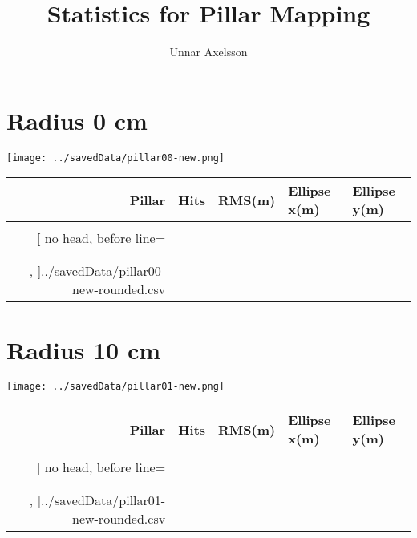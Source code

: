 \documentclass{article}
\begin{document}
\title{Statistics for Pillar Mapping}
\author{Unnar  Axelsson}

\maketitle

\section{Radius 0 cm}

\begin{center}
\texttt{[image: ../savedData/pillar00-new.png]}

\begin{tabular}{r|llll}
	\toprule%
	\bfseries Pillar & \bfseries Hits & \bfseries RMS(m) & \bfseries Ellipse x(m) & \bfseries Ellipse y(m)\\\midrule\\[-0.8cm]
	\csvreader[%
	  no head,
	  before line=\ifthenelse{\equal{\csvcoli}{Average}}{\\\midrule}{\\},
	  late after last line = \\\bottomrule,
	]{../savedData/pillar00-new-rounded.csv}{}{%
	  \csvcoli&\csvcolii&\csvcoliii&\csvcoliv&\csvcolv
	}
\end{tabular}
\end{center}



\newpage
\section{Radius 10 cm}
\begin{center}

\texttt{[image: ../savedData/pillar01-new.png]}

\begin{tabular}{r|llll}
	\toprule%
	\bfseries Pillar & \bfseries Hits & \bfseries RMS(m) & \bfseries Ellipse x(m) & \bfseries Ellipse y(m)\\\midrule\\[-0.8cm]
	\csvreader[%
	  no head,
	  before line=\ifthenelse{\equal{\csvcoli}{Average}}{\\\midrule}{\\},
	  late after last line = \\\bottomrule,
	]{../savedData/pillar01-new-rounded.csv}{}{%
	  \csvcoli&\csvcolii&\csvcoliii&\csvcoliv&\csvcolv
	}
\end{tabular}
\end{center}
\end{document}
